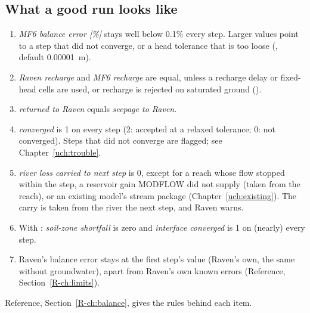 \subsection{What a good run looks like}
\begin{enumerate}
\item \emph{MF6 balance error [\%]} stays well below 0.1\% every step. Larger values point to a step that did not
converge, or a head tolerance that is too loose (, default 0.00001~m).
\item \emph{Raven recharge} and \emph{MF6 recharge} are equal, unless a recharge delay or fixed-head cells are used, or
recharge is rejected on saturated ground ().
\item \emph{returned to Raven} equals \emph{seepage to Raven}.
\item \emph{converged} is 1 on every step (2: accepted at a relaxed tolerance; 0: not converged). Steps that did not
converge are flagged; see Chapter~\ref{uch:trouble}.
\item \emph{river loss carried to next step} is 0, except for a reach whose flow stopped within the step, a reservoir gain
MODFLOW did not supply (taken from the reach), or an existing model's stream package (Chapter~\ref{uch:existing}). The
carry is taken from the river the next step, and Raven warns.
\item With : \emph{soil-zone shortfall} is zero and \emph{interface converged} is 1 on (nearly)
every step.
\item Raven's  balance error stays at the first step's value (Raven's own, the same without
groundwater), apart from Raven's own known errors (Reference, Section~\ref{R-ch:limits}).
\end{enumerate}
Reference, Section~\ref{R-ch:balance}, gives the rules behind each item.

